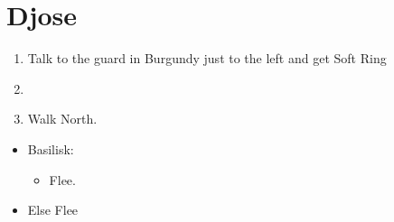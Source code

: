 \chapter{Djose}
\begin{enumerate}
	\item Talk to the guard in Burgundy just to the left and get Soft Ring
	\item \formation{\tidus}{\yuna}{\auron}
	\item Walk North.
\end{enumerate}
\begin{encounters}
	\begin{itemize}
		\item Basilisk:
		      \begin{itemize}
			      \kimahrif Lancet Basilisk, learn \textbf{Stone Breath}
			      \item Flee.
		      \end{itemize}
		\item Else Flee
	\end{itemize}
\end{encounters}
